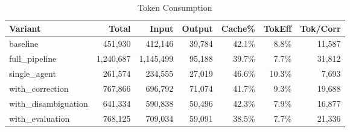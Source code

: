 \begin{table}[htbp]
\centering
\caption{Token Consumption}
\label{tab:tokens}
\begin{tabular}{l rrrr rr}
\toprule
Variant & Total & Input & Output & Cache\% & TokEff & Tok/Corr \\
\midrule
  baseline & 451,930 & 412,146 & 39,784 & 42.1\% & 8.8\% & 11,587 \\
  full\_pipeline & 1,240,687 & 1,145,499 & 95,188 & 39.7\% & 7.7\% & 31,812 \\
  single\_agent & 261,574 & 234,555 & 27,019 & 46.6\% & 10.3\% & 7,693 \\
  with\_correction & 767,866 & 696,792 & 71,074 & 41.7\% & 9.3\% & 19,688 \\
  with\_disambiguation & 641,334 & 590,838 & 50,496 & 42.3\% & 7.9\% & 16,877 \\
  with\_evaluation & 768,125 & 709,034 & 59,091 & 38.5\% & 7.7\% & 21,336 \\
\bottomrule
\end{tabular}
\end{table}
